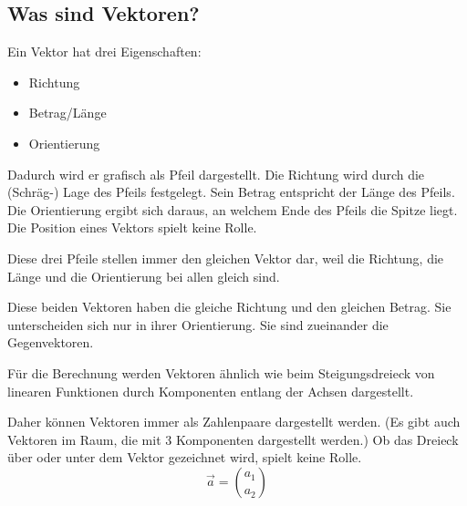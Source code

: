 \subsection{Was sind Vektoren?}

Ein Vektor hat drei Eigenschaften:\\
\begin{itemize}
    \item Richtung
    \item Betrag/Länge
    \item Orientierung
\end{itemize}
Dadurch wird er grafisch als Pfeil dargestellt. Die Richtung wird durch die (Schräg-) Lage des Pfeils festgelegt.
Sein Betrag entspricht der Länge des Pfeils. Die Orientierung ergibt sich daraus, an welchem Ende des Pfeils die Spitze liegt.
Die Position eines Vektors spielt keine Rolle.

\hfill \break
Diese drei Pfeile stellen immer den gleichen Vektor dar, weil die Richtung, die Länge und die Orientierung bei allen gleich sind.


\break
Diese beiden Vektoren haben die gleiche Richtung und den gleichen Betrag.
Sie unterscheiden sich nur in ihrer Orientierung. Sie sind zueinander die Gegenvektoren.



\hfill \break
Für die Berechnung werden Vektoren ähnlich wie beim Steigungsdreieck von linearen Funktionen durch Komponenten entlang der Achsen dargestellt.

\hfill \break
Daher können Vektoren immer als Zahlenpaare dargestellt werden.
(Es gibt auch Vektoren im Raum, die mit 3 Komponenten dargestellt werden.)
Ob das Dreieck über oder unter dem Vektor gezeichnet wird, spielt keine Rolle.\\
$$\vec{a} = \binom{a_1}{a_2}$$